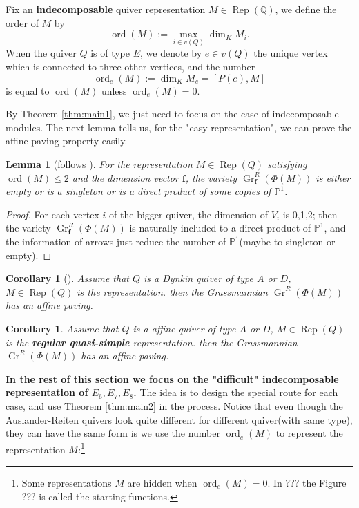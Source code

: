 \documentclass[reqno,11pt]{amsart}
\numberwithin{equation}{section}
\theoremstyle{plain}
\newtheorem{lemma}[theorem]{Lemma}
\newtheorem{corollary}[theorem]{Corollary}
\theoremstyle{plain}
\numberwithin{equation}{section}
\theoremstyle{remark}
\DeclareMathOperator{\Rep}{\operatorname{Rep}}
\newcommand{\Grr}{\operatorname{Gr}^{R}}
\newcommand{\dimvec}[1]{\mathbf{#1}}
\newcommand{\ord}{\operatorname{ord}}
\newcommand{\orde}{\operatorname{ord}_e }
\begin{document}
Fix an \textbf{indecomposable} quiver representation $M \in \Rep(\mathbb{Q})$, we define the order of $M$ by
$$\ord(M):= \max_{i \in v(Q)} \dim_K M_i.$$
When the quiver $Q$ is of type $E$, we denote by $e \in v(Q)$ the unique vertex which is connected to three other vertices, and the number 
$$\orde(M):=\dim_K M_e=[P(e),M]$$
is equal to $\ord(M)$ unless $\orde(M)=0$.

By Theorem \ref{thm:main1}, we just need to focus on the case of indecomposable modules. The next lemma tells us, for the "easy representation", we can prove the affine paving property easily.

\begin{lemma}[{follows \cite[Lemma 2.22]{maksimau2019flag}}]
	For the representation $M \in \Rep(Q)$ satisfying $\ord(M) \leqslant 2$ and the dimension vector $\dimvec{f}$, the variety $\Grr_{\dimvec{f}}(\Phi(M))$ is either empty or is a singleton or is a direct product of some copies of $\mathbb{P}^1$.
\end{lemma}
\begin{proof}
	For each vertex $i$ of the bigger quiver, the dimension of $V_i$ is 0,1,2; then the variety $\Grr_{\dimvec{f}}(\Phi(M))$ is naturally included to a direct product of $\mathbb{P}^1$, and the information of arrows just reduce the number of $\mathbb{P}^1$(maybe to singleton or empty).
\end{proof}
\begin{corollary}[{\cite[Theorem 2.20]{maksimau2019flag}}]
	Assume that $Q$ is a Dynkin quiver of type $A$ or $D$, $M \in \Rep(Q)$ is the representation. then the Grassmannian $\Grr(\Phi(M))$ has an affine paving.
\end{corollary}
\begin{corollary}\label{cor:affineADcase}
	Assume that $Q$ is a affine quiver of type $A$ or $D$, $M \in \Rep(Q)$ is the \textbf{regular quasi-simple} representation. then the Grassmannian $\Grr(\Phi(M))$ has an affine paving.
\end{corollary}

\textbf{In the rest of this section we focus on the "difficult" indecomposable representation of $E_6,E_7,E_8$.} The idea is to design the special route for each case, and use Theorem \ref{thm:main2} in the process. Notice that even though the Auslander-Reiten quivers look quite different for different quiver(with same type), they can have the same form is we use the number $\orde(M)$ to represent the representation $M$:\footnote{Some representations $M$ are hidden when $\orde(M)=0$. In ??? the Figure ??? is called the starting functions.}
\end{document}

